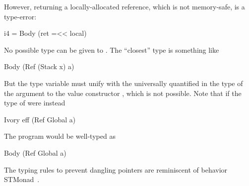 However, returning a locally-allocated reference, which is not memory-safe, is a
type-error:
\begin{code}
i4 = Body (ret =<< local)
\end{code}
\noindent
No possible type can be given to .  The ``closest'' type is something
like
\begin{code}
Body (Ref (Stack x) a)
\end{code}
\noindent
But the type variable  must unify with the universally quantified
 in the type of the argument to the value constructor , which is
not possible.  Note that if the type of  were instead
\begin{code}
Ivory eff (Ref Global a)
\end{code}
\noindent
The program  would be well-typed as
\begin{code}
Body (Ref Global a)
\end{code}
\noindent
The typing rules to prevent dangling pointers are reminiscent of behavior
STMonad~\cite{stmonad}.







